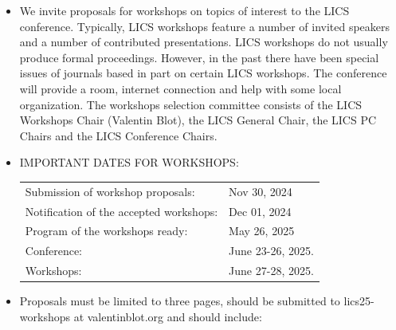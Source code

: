 \documentclass[prodmode,acmtecs]{acmsmall} %
\begin{document}
\begin{itemize}\item  We invite proposals for workshops on topics of interest to the LICS conference. Typically, LICS workshops feature a number of invited speakers and a number of contributed presentations. LICS workshops do not usually produce formal proceedings. However, in the past there have been special issues of journals based in part on certain LICS workshops. The conference will provide a room, internet connection and help with some local organization. The workshops selection committee consists of the LICS Workshops Chair (Valentin Blot), the LICS General Chair, the LICS PC Chairs and the LICS Conference Chairs. 
 
\item  IMPORTANT DATES FOR WORKSHOPS: 
 
\begin{tabulary}{\linewidth}{LL}Submission of workshop proposals:  & Nov 30, 2024 \\
Notification of the accepted workshops:  & Dec 01, 2024 \\
Program of the workshops ready:  & May 26, 2025 \\
Conference:  & June 23-26, 2025. \\
Workshops:  & June 27-28, 2025. \\
\end{tabulary}
 
\item  Proposals must be limited to three pages, should be submitted to lics25-workshops at valentinblot.org and should include: 
 

\end{itemize}
\end{document}
